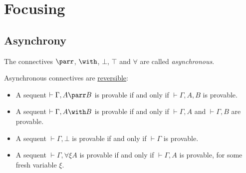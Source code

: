 \section{Focusing}\label{reversibility-and-focusing}

\subsection{Asynchrony}\label{asynchrony}

The connectives $\parr$, $\with$, $\bot$, $\top$ and $\forall$ are called \emph{asynchronous}.

\begin{theorem}
Asynchronous connectives are \hyperref[reversibledef]{reversible}:
\begin{itemize}
\item A sequent $\vdash\Gamma,A\parr B$ is provable if and only if $\vdash\Gamma,A,B$ is provable.
\item A sequent $\vdash\Gamma,A\with B$ is provable if and only if $\vdash\Gamma,A$ and $\vdash\Gamma,B$ are provable.
\item A sequent $\vdash\Gamma,\bot$ is provable if and only if $\vdash\Gamma$ is provable.
\item A sequent $\vdash\Gamma,\forall\xi A$ is provable if and only if $\vdash\Gamma,A$ is provable, for some fresh variable $\xi$.
\end{itemize}
\end{theorem}

